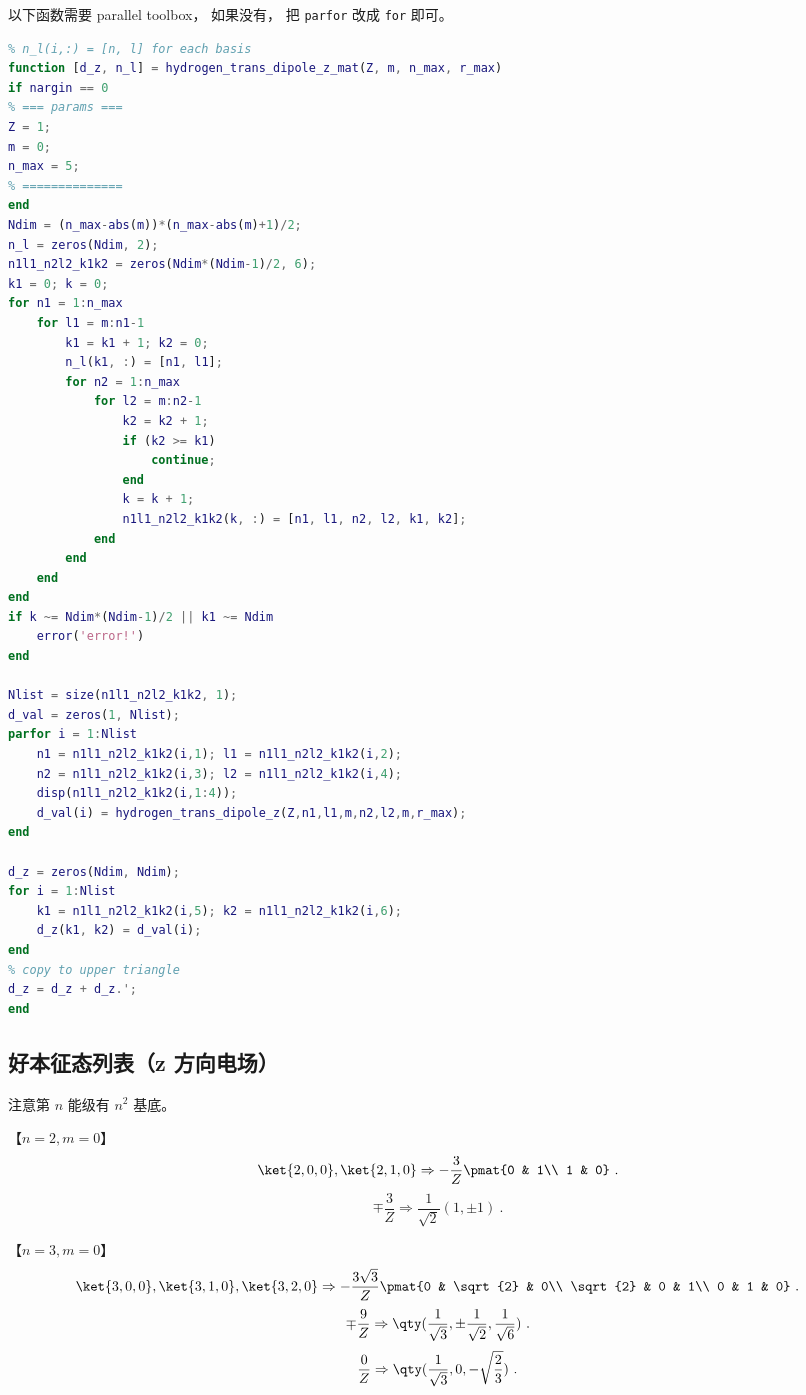 以下函数需要 parallel toolbox， 如果没有， 把 \verb`parfor` 改成 \verb`for` 即可。
\begin{lstlisting}[language=matlab,caption=hydrogen\_dipole\_z\_mat.m]
% hydrogen <n1,l1,m1|z|n2,l2,m2> matrix
% n_l(i,:) = [n, l] for each basis
function [d_z, n_l] = hydrogen_trans_dipole_z_mat(Z, m, n_max, r_max)
if nargin == 0
% === params ===
Z = 1;
m = 0;
n_max = 5;
% ==============
end
Ndim = (n_max-abs(m))*(n_max-abs(m)+1)/2;
n_l = zeros(Ndim, 2);
n1l1_n2l2_k1k2 = zeros(Ndim*(Ndim-1)/2, 6);
k1 = 0; k = 0;
for n1 = 1:n_max
    for l1 = m:n1-1
        k1 = k1 + 1; k2 = 0;
        n_l(k1, :) = [n1, l1];
        for n2 = 1:n_max
            for l2 = m:n2-1
                k2 = k2 + 1;
                if (k2 >= k1)
                    continue;
                end
                k = k + 1;
                n1l1_n2l2_k1k2(k, :) = [n1, l1, n2, l2, k1, k2];
            end
        end
    end
end
if k ~= Ndim*(Ndim-1)/2 || k1 ~= Ndim
    error('error!')
end

Nlist = size(n1l1_n2l2_k1k2, 1);
d_val = zeros(1, Nlist);
parfor i = 1:Nlist
    n1 = n1l1_n2l2_k1k2(i,1); l1 = n1l1_n2l2_k1k2(i,2);
    n2 = n1l1_n2l2_k1k2(i,3); l2 = n1l1_n2l2_k1k2(i,4);
    disp(n1l1_n2l2_k1k2(i,1:4));
    d_val(i) = hydrogen_trans_dipole_z(Z,n1,l1,m,n2,l2,m,r_max);
end

d_z = zeros(Ndim, Ndim);
for i = 1:Nlist
    k1 = n1l1_n2l2_k1k2(i,5); k2 = n1l1_n2l2_k1k2(i,6);
    d_z(k1, k2) = d_val(i);
end
% copy to upper triangle
d_z = d_z + d_z.';
end
\end{lstlisting}

\subsection{好本征态列表（z 方向电场）}\label{sub_HDipM_1}
注意第 $n$ 能级有 $n^2$ 基底。

【$n=2, m=0$】
\begin{equation}
\ket{2,0,0},\ket{2,1,0} \Rightarrow-\frac{3}{Z}\pmat{0 & 1\\ 1 & 0}~.
\end{equation}
\begin{equation}
\mp\frac{3}{Z} \Rightarrow \frac{1}{\sqrt{2}}(1, \pm1)~.
\end{equation}

【$n=3, m=0$】
\begin{equation}
\ket{3,0,0},\ket{3,1,0},\ket{3,2,0}\Rightarrow
-\frac{3\sqrt{3}}{Z}\pmat{0 & \sqrt{2} & 0\\ \sqrt{2} & 0 & 1\\ 0 & 1 & 0}~.
\end{equation}
\begin{equation}
\mp\frac{9}{Z} \Rightarrow \qty(\frac{1}{\sqrt{3}}, \pm \frac{1}{\sqrt{2}}, \frac{1}{\sqrt{6}})~.
\end{equation}
\begin{equation}
\frac{0}{Z} \Rightarrow \qty(\frac{1}{\sqrt{3}}, 0, -\sqrt{\frac{2}{3}})~.
\end{equation}

